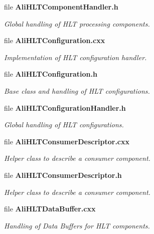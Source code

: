 \begin{CompactItemize}
\item 
file {\bf Ali\-HLTComponent\-Handler.h}
\begin{CompactList}\small\item\em Global handling of HLT processing components. \item\end{CompactList}

\item 
file {\bf Ali\-HLTConfiguration.cxx}
\begin{CompactList}\small\item\em Implementation of HLT configuration handler. \item\end{CompactList}

\item 
file {\bf Ali\-HLTConfiguration.h}
\begin{CompactList}\small\item\em Base class and handling of HLT configurations. \item\end{CompactList}

\item 
file {\bf Ali\-HLTConfiguration\-Handler.h}
\begin{CompactList}\small\item\em Global handling of HLT configurations. \item\end{CompactList}

\item 
file {\bf Ali\-HLTConsumer\-Descriptor.cxx}
\begin{CompactList}\small\item\em Helper class to describe a consumer component. \item\end{CompactList}

\item 
file {\bf Ali\-HLTConsumer\-Descriptor.h}
\begin{CompactList}\small\item\em Helper class to describe a consumer component. \item\end{CompactList}

\item 
file {\bf Ali\-HLTData\-Buffer.cxx}
\begin{CompactList}\small\item\em Handling of Data Buffers for HLT components. \item\end{CompactList}


\end{CompactItemize}

